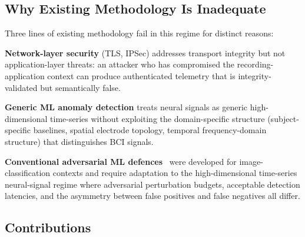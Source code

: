 \documentclass[sigconf,nonacm]{acmart}
\begin{document}
\subsection{Why Existing Methodology Is Inadequate}

Three lines of existing methodology fail in this regime for
distinct reasons:

\textbf{Network-layer security} (TLS, IPSec) addresses transport
integrity but not application-layer threats: an attacker who has
compromised the recording-application context can produce
authenticated telemetry that is integrity-validated but
semantically false.

\textbf{Generic ML anomaly detection} treats neural signals as
generic high-dimensional time-series without exploiting the
domain-specific structure (subject-specific baselines, spatial
electrode topology, temporal frequency-domain structure) that
distinguishes BCI signals.

\textbf{Conventional adversarial ML defences}~\cite{biggio2018wild,
madry2018towards} were developed for image-classification
contexts and require adaptation to the high-dimensional time-series
neural-signal regime where adversarial perturbation budgets,
acceptable detection latencies, and the asymmetry between false
positives and false negatives all differ.

\subsection{Contributions}
\end{document}
